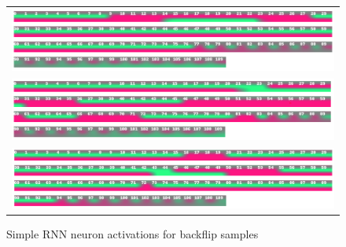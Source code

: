 \begin{figure}
   \centering
\begin{tabular}{c}
\includegraphics[width=\textwidth]{images/classifier/neuron-activations-simple-rnn-model-3/backflip-23-tiit}\\
\includegraphics[width=\textwidth]{images/classifier/neuron-activations-simple-rnn-model-3/backflip-40-margus}\\
\includegraphics[width=\textwidth]{images/classifier/neuron-activations-simple-rnn-model-3/backflip-6-rasmus}\\
\end{tabular}
    \caption{Simple RNN neuron activations for backflip samples}
    \label{backflip-neuron-activations-simple-rnn}
\end{figure}

